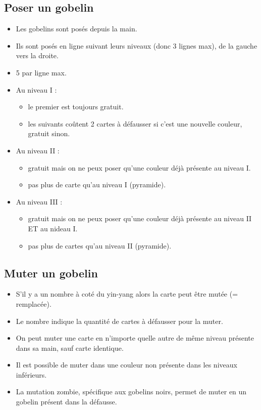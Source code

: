 \documentclass[10pt, a4paper]{article}	%
\begin{document}
\begin{multicols}{3}
\subsection{Poser un gobelin}
\begin{itemize}
\item Les gobelins sont posés depuis la main.
\item Ils sont posés en ligne suivant leurs niveaux (donc 3 lignes max), de la gauche vers la droite.
\item 5 par ligne max.
\item Au niveau I :
	\begin{itemize}
	\item le premier est toujours gratuit.
	\item les suivants coûtent 2 cartes à défausser si c'est une nouvelle couleur, gratuit sinon.
	\end{itemize}
\item Au niveau II :
	\begin{itemize}
	\item gratuit mais on ne peux poser qu’une couleur déjà présente au niveau I.
	\item pas plus de carte qu'au niveau I (pyramide).
	\end{itemize}
\item Au niveau III :
	\begin{itemize}
	\item gratuit mais on ne peux poser qu'une couleur déjà présente au niveau II ET au nideau I.
	\item pas plus de cartes qu’au niveau II (pyramide).
	\end{itemize}
\end{itemize}

\subsection{Muter un gobelin}
\begin{itemize}
\item S'il y a un nombre à coté du yin-yang alors la carte peut être mutée (= remplacée).
\item Le nombre indique la quantité de cartes à défausser pour la muter.
\item On peut muter une carte en n'importe quelle autre de même niveau présente dans sa main, sauf carte identique.
\item Il est possible de muter dans une couleur non présente dans les niveaux inférieurs.
\item La mutation zombie, spécifique aux gobelins noirs, permet de muter en un gobelin présent dans la défausse.
\end{itemize}



\end{multicols}
\end{document}
